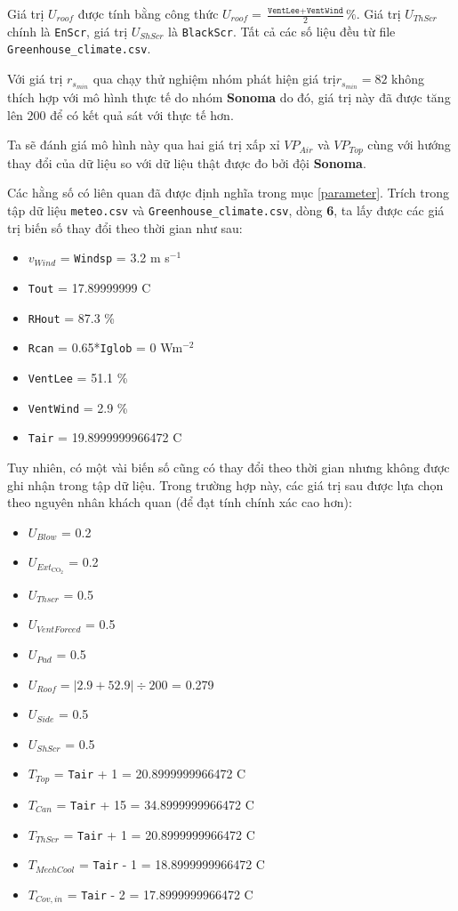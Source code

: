 \documentclass[a4paper]{article}
\begin{document}
Giá trị $U_{roof}$ được tính bằng công thức $U_{roof} = \frac{\texttt{VentLee}+\texttt{VentWind}}{2}\%$. Giá trị $U_{ThScr}$ chính là \texttt{EnScr}, giá trị $U_{ShScr}$ là \texttt{BlackScr}. Tất cả các số liệu đều từ file  \texttt{Greenhouse\_climate.csv}. 

Với giá trị $r_{s_{min}}$ qua chạy thử nghiệm nhóm phát hiện giá trị$r_{s_{min}} = 82$ không thích hợp với mô hình thực tế do nhóm \textbf{Sonoma} do đó, giá trị này đã được tăng lên $200$ để có kết quả sát với thực tế hơn.  

Ta sẽ đánh giá mô hình này qua hai giá trị xấp xỉ $VP_{Air}$ và $VP_{Top}$ cùng với hướng thay đổi của dữ liệu so với dữ liệu thật được đo bởi đội \textbf{Sonoma}.

Các hằng số có liên quan đã được định nghĩa trong mục \ref{parameter}. Trích trong tập dữ liệu \texttt{meteo.csv} và \texttt{Greenhouse\_climate.csv}, dòng \textbf{6}, ta lấy được các giá trị biến số thay đổi theo thời gian như sau:

\begin{itemize}
    \item $v_{Wind}$ = \texttt{Windsp} = 3.2 m s$^{-1}$ 
    \item \texttt{Tout} = 17.89999999 \degree C
    \item \texttt{RHout} = 87.3 \%
    \item \texttt{Rcan} = 0.65*\texttt{Iglob} = 0 Wm$^{-2}$
    \item \texttt{VentLee} = 51.1 \%
    \item \texttt{VentWind} = 2.9 \%
    \item \texttt{Tair} = 19.8999999966472 \degree C
\end{itemize}

Tuy nhiên, có một vài biến số cũng có thay đổi theo thời gian nhưng không được ghi nhận trong tập dữ liệu. Trong trường hợp này, các giá trị sau được lựa chọn theo nguyên nhân khách quan (để đạt tính chính xác cao hơn):
\begin{itemize}
    \item $U_{Blow}$ = 0.2
    \item $U_{Ext_\mathrm{CO_2}}$ = 0.2
    \item $U_{Thscr}$ = 0.5
    \item $U_{VentForced}$ = 0.5
    \item $U_{Pad}$ = 0.5
    \item $U_{Roof} = \left | 2.9 + 52.9\right | \div 200$ =  0.279
    \item $U_{Side}$ = 0.5
    \item $U_{ShScr}$ = 0.5
    \item $T_{Top}$ = \texttt{Tair} + 1 = 20.8999999966472 \degree C
    \item $T_{Can}$ = \texttt{Tair} + 15 = 34.8999999966472 \degree C
    \item $T_{ThScr}$ = \texttt{Tair} + 1 = 20.8999999966472 \degree C
    \item $T_{MechCool}$ = \texttt{Tair} - 1 = 18.8999999966472 \degree C
    \item $T_{Cov,in}$ = \texttt{Tair} - 2 = 17.8999999966472 \degree C
\end{itemize}
\end{document}
